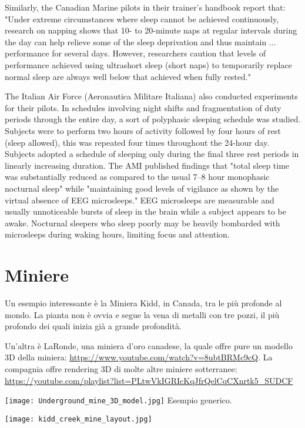 \documentclass[a4paper,10pt,openany,oneside]{memoir}
\begin{document}
Similarly, the Canadian Marine pilots in their trainer's handbook report that: "Under extreme circumstances where sleep cannot be achieved continuously, research on napping shows that 10- to 20-minute naps at regular intervals during the day can help relieve some of the sleep deprivation and thus maintain ... performance for several days. However, researchers caution that levels of performance achieved using ultrashort sleep (short naps) to temporarily replace normal sleep are always well below that achieved when fully rested."

The Italian Air Force (Aeronautica Militare Italiana) also conducted experiments for their pilots. In schedules involving night shifts and fragmentation of duty periods through the entire day, a sort of polyphasic sleeping schedule was studied. Subjects were to perform two hours of activity followed by four hours of rest (sleep allowed), this was repeated four times throughout the 24-hour day. Subjects adopted a schedule of sleeping only during the final three rest periods in linearly increasing duration. The AMI published findings that "total sleep time was substantially reduced as compared to the usual 7–8 hour monophasic nocturnal sleep" while "maintaining good levels of vigilance as shown by the virtual absence of EEG microsleeps." EEG microsleeps are measurable and usually unnoticeable bursts of sleep in the brain while a subject appears to be awake. Nocturnal sleepers who sleep poorly may be heavily bombarded with microsleeps during waking hours, limiting focus and attention.

\section{Miniere}

Un esempio interessante è la Miniera Kidd, in Canada, tra le più profonde al mondo. La pianta non è ovvia e segue la vena di metalli con tre pozzi, il più profondo dei quali inizia già a grande profondità.

Un'altra è LaRonde, una miniera d'oro canadese, la quale offre pure un modello 3D della miniera: \url{https://www.youtube.com/watch?v=8ubtBRMc9cQ}. La compagnia offre rendering 3D di molte altre miniere sotterranee: \url{https://youtube.com/playlist?list=PLtwVkIGRIcKqJfrQelCqCXnrtk5_SUDCF}

\texttt{[image: Underground\_mine\_3D\_model.jpg]}
Esempio generico.

\texttt{[image: kidd\_creek\_mine\_layout.jpg]}
\end{document}
